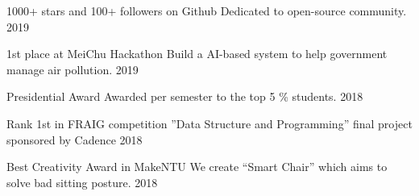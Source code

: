 \cvsubsection{}

\begin{cvhonors}
  \cvhonor
    {1000+ stars and 100+ followers on Github} %
    {Dedicated to open-source community.} %
    {} %
    {2019} %

  \cvhonor
    {1st place at MeiChu Hackathon} %
    {Build a AI-based system to help government manage air pollution.} %
    {} %
    {2019} %

  \cvhonor
    {Presidential Award} %
    {Awarded per semester to the top 5 \% students.} %
    {} %
    {2018} %

  \cvhonor
    {Rank 1st in FRAIG competition} %
    {”Data Structure and Programming” final project sponsored by Cadence} %
    {} %
    {2018} %

  \cvhonor
    {Best Creativity Award in MakeNTU} %
    {We create “Smart Chair” which aims to solve bad sitting posture.} %
    {} %
    {2018} %

\end{cvhonors}
